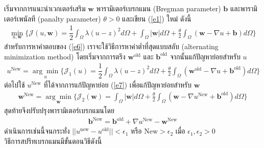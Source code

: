 \hspace{1cm} เริ่มจากการแนะนำเวกเตอร์เสริม $\boldsymbol{w}$ พารามิเตอร์เบรกแมน (Bregman parameter) $\boldsymbol{b}$ และพารามิเตอร์เพนัลที (panalty parameter) $\theta>0$ และเขียน (\ref{e1}) ใหม่ ดังนี้
	\begin{align}
	\min_{u,\boldsymbol{w}} \{ \mathcal{J}(u,\boldsymbol{w}) = \dfrac{1}{2} \int_{\Omega} \lambda(u-z)^2 d\Omega +  \int_{\Omega}  | \boldsymbol{w}|  d\Omega + \frac{\theta}{2} \int_{\Omega} (\boldsymbol{w} - \nabla u + \boldsymbol{b}) d\Omega \}
	\label{e6}
	\end{align}
	\hspace{1cm}สำหรับการหาคำตอบของ (\ref{e6}) เราจะใช้วิธีการหาค่าต่ำที่สุดแบบสลับ (alternating minimization method) โดยเริ่มจากการตรึง $\boldsymbol{w}^{\text{old}}$ และ $\boldsymbol{b}^{\text{old}}$ จากนั้นแก้ปัญหาย่อยสำหรับ $u$
	\begin{align}
	u^{\text{New}}=\underset{u}{\arg\min} \{ \mathcal{J}_1(u) = \dfrac{1}{2} \int_{\Omega} \lambda(u-z)^2 d\Omega + \frac{\theta}{2} \int_{\Omega} (\boldsymbol{w}^{\text{old}} - \nabla u + \boldsymbol{b}^{\text{old}}) d\Omega \}
	\label{e7}
	\end{align}
	ต่อไปใช้ $u^{\text{New}}$ ที่ได้จากการแก้ปัญหาย่อย (\ref{e7}) เพื่อแก้ปัญหาย่อยสำหรับ $\boldsymbol{w}$
	\begin{align}
	\boldsymbol{w}^{\text{New}}=\underset{\boldsymbol{w}}{\arg\min} \{ \mathcal{J}_2(\boldsymbol{w}) = \int_{\Omega}  |\boldsymbol{w}|  d\Omega  + \frac{\theta}{2} \int_{\Omega} (\boldsymbol{w} - \nabla u^{\text{New}} + \boldsymbol{b}^{\text{old}}) d\Omega \}
	\label{e8}
	\end{align}
	สุดท้ายจึงปรับปรุงพารามิเตอร์เบรกแมนโดย 
	\begin{align}
	\boldsymbol{b}^{\text{New}}=\boldsymbol{b}^{\text{old}}+\nabla u^{\text{New}}-\boldsymbol{w}^{\text{New}}
	\label{e9}
	\end{align}
	ดำเนินการเช่นนี้จนกระทั่ง $||u^{\text{new}}-u^{\text{old}}||< \epsilon_1$ หรือ $\text{New}>\epsilon_2$ เมื่อ $\epsilon_1,\epsilon_2>0$ \\ 
	\vspace{0.5cm}
	\hspace{1cm}วิธีการสปริทเบรกแมนมีขั้นตอนวิธีดังนี้ \\
	\vspace{0.5cm}
